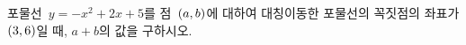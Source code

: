 포물선~$y=-x^2+2x+5$를 점~$(a{,}\mkern3mu\mathopen{}b)$에 대하여 대칭이동한 포물선의 꼭짓점의 좌표가 $(3{,}\mkern3mu\mathopen{}6)$일 때, $a+b$의 값을 구하시오.
